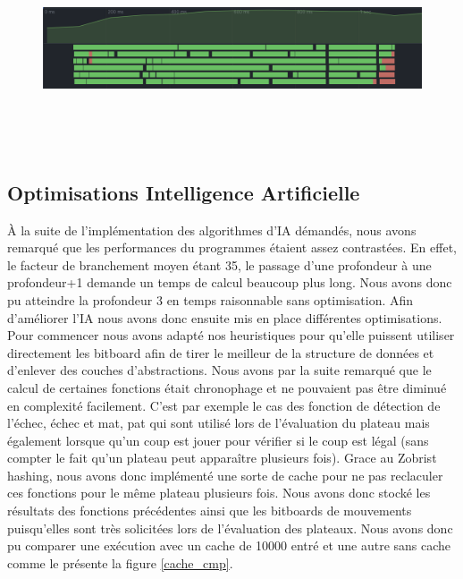 \documentclass{article}
\begin{document}
\begin{figure}[h]
    \centering
    \includegraphics[width=\textwidth,height=6.0cm,keepaspectratio]{threads_ex.png}
    \caption{}
    \label{thread_ex}
\end{figure}

\subsection{Optimisations Intelligence Artificielle}
À la suite de l'implémentation des algorithmes d'IA démandés, nous avons remarqué que les performances du programmes étaient assez contrastées. En effet, le facteur
de branchement moyen étant 35, le passage d'une profondeur à une profondeur+1 demande un temps de calcul beaucoup plus long. Nous avons donc pu atteindre la profondeur 3
en temps raisonnable sans optimisation. Afin d'améliorer l'IA nous avons donc ensuite mis en place différentes optimisations. Pour commencer nous avons adapté nos heuristiques
pour qu'elle puissent utiliser directement les bitboard afin de tirer le meilleur de la structure de données et d'enlever des couches d'abstractions. Nous avons par la suite 
remarqué que le calcul de certaines fonctions était chronophage et ne pouvaient pas être diminué en complexité facilement. C'est par exemple le cas des fonction de détection de 
l'échec, échec et mat, pat qui sont utilisé lors de l'évaluation du plateau mais également lorsque qu'un coup est jouer pour vérifier si le coup est légal (sans compter le fait 
qu'un plateau peut apparaître plusieurs fois). Grace au Zobrist hashing, nous avons donc implémenté une sorte de cache pour ne pas reclaculer ces fonctions pour le même plateau 
plusieurs fois. Nous avons donc stocké les résultats des fonctions précédentes ainsi que les bitboards de mouvements puisqu'elles sont très solicitées lors de l'évaluation des
plateaux. Nous avons donc pu comparer une exécution avec un cache de 10000 entré et une autre sans cache comme le présente la figure \ref{cache_cmp}.
\end{document}
